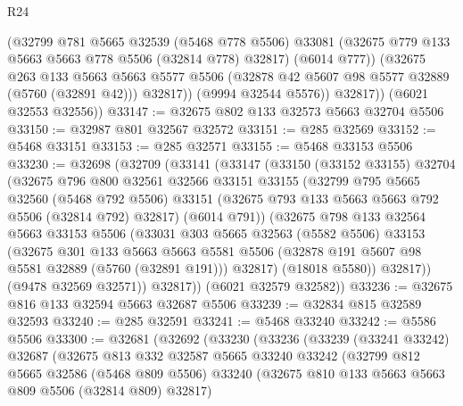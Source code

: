 \begin{lexlean}{R24}
\begin{coremodule}
              (@32799
                @781
                @5665
                @32539
                (@5468 @778 @5506)
                @33081
                (@32675 @779 @133 @5663 @5663 @778 @5506 (@32814 @778) @32817)
                (@6014 @777))
              (@32675
                @263
                @133
                @5663
                @5663
                @5577
                @5506
                (@32878 @42 @5607 @98 @5577 @32889 (@5760 (@32891 @42)))
                @32817))
            (@9994 @32544 @5576))
          @32817))
      (@6021 @32553 @32556))
@33147 := @32675 @802 @133 @32573 @5663 @32704 @5506
@33150 := @32987 @801 @32567 @32572
@33151 := @285 @32569
@33152 := @5468 @33151
@33153 := @285 @32571
@33155 := @5468 @33153 @5506
@33230 := @32698
    (@32709
      (@33141
        (@33147
          (@33150
            (@33152 @33155)
            @32704
            (@32675
              @796
              @800
              @32561
              @32566
              @33151
              @33155
              (@32799
                @795
                @5665
                @32560
                (@5468 @792 @5506)
                @33151
                (@32675 @793 @133 @5663 @5663 @792 @5506 (@32814 @792) @32817)
                (@6014 @791))
              (@32675
                @798
                @133
                @32564
                @5663
                @33153
                @5506
                (@33031
                  @303
                  @5665
                  @32563
                  (@5582 @5506)
                  @33153
                  (@32675
                    @301
                    @133
                    @5663
                    @5663
                    @5581
                    @5506
                    (@32878 @191 @5607 @98 @5581 @32889 (@5760 (@32891 @191)))
                    @32817)
                  (@18018 @5580))
                @32817))
            (@9478 @32569 @32571))
          @32817))
      (@6021 @32579 @32582))
@33236 := @32675 @816 @133 @32594 @5663 @32687 @5506
@33239 := @32834 @815 @32589 @32593
@33240 := @285 @32591
@33241 := @5468 @33240
@33242 := @5586 @5506
@33300 := @32681
    (@32692
      (@33230
        (@33236
          (@33239
            (@33241 @33242)
            @32687
            (@32675
              @813
              @332
              @32587
              @5665
              @33240
              @33242
              (@32799
                @812
                @5665
                @32586
                (@5468 @809 @5506)
                @33240
                (@32675 @810 @133 @5663 @5663 @809 @5506 (@32814 @809) @32817)

\end{coremodule}
\end{lexlean}
